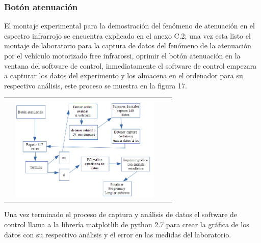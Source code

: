 \documentclass[12]{article}
\newenvironment{Figure}
{\par\medskip\noindent\minipage{\linewidth}}
{\endminipage\par\medskip}
\begin{document}
\begin{multicols}{2}
\subsubsection{Botón atenuación}
El montaje experimental para la demostración del fenómeno de atenuación en el espectro infrarrojo se encuentra explicado en el anexo C.2; una vez esta listo el montaje de laboratorio para la captura de datos del fenómeno de la atenuación por el vehículo motorizado free infrarossi, oprimir el botón atenuación en la ventana del software de control,  inmediatamente el software de control empezara a capturar los datos del experimento y los almacena en el ordenador para su respectivo análisis, este proceso se muestra en la figura 17.
\begin{Figure}	
\center
\begin{tabular}{|l|r|}
\hline\\
\includegraphics[width=8cm, height=5cm]{img/diagrama2.png} \\ \hline
\end{tabular}
\label{fig:g17}
\end{Figure}
Una vez terminado el proceso de captura y análisis de datos el software de control llama a la librería matplotlib de python 2.7 para crear la gráfica de los datos con su respectivo análisis y el error en las medidas del laboratorio.

\end{multicols}
\end{document}
